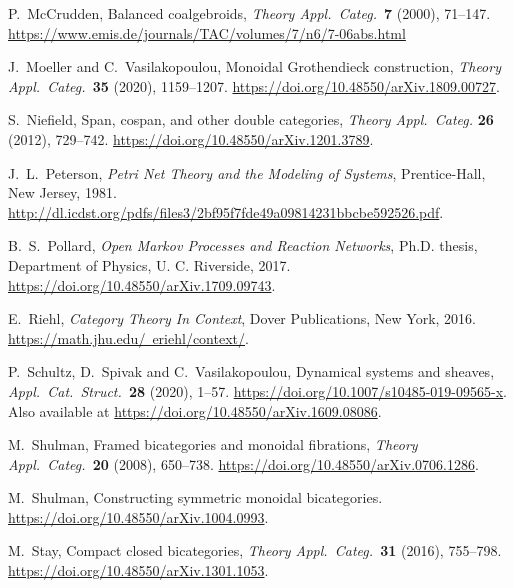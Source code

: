 \documentclass[ a4paper, onecolumn, superscriptaddress,10pt, accepted=2022-02-14, issue=3, volume=4, shorttitle=papers/compositionality-4-3 ]{compositionalityarticle}
\begin{document}
\begin{thebibliography}{100}
 P.\ McCrudden, Balanced coalgebroids, \textsl{Theory Appl.\ Categ.\ }\textbf{7} (2000), 71--147.  \hfill  \break
 \href{https://www.emis.de/journals/TAC/volumes/7/n6/7-06abs.html}{https://www.emis.de/journals/TAC/volumes/7/n6/7-06abs.html}

 J.\ Moeller and C.\ Vasilakopoulou, Monoidal Grothendieck construction, \textsl{Theory Appl.\ Categ.\ }\textbf{35} (2020), 1159--1207.  \href{https://doi.org/10.48550/arXiv.1809.00727}{https://doi.org/10.48550/arXiv.1809.00727}.

 S.~Niefield, Span, cospan, and other double categories, \textsl{Theory Appl.\ Categ.} \textbf{26} (2012), 729--742.  \href{https://doi.org/10.48550/arXiv.1201.3789}{https://doi.org/10.48550/arXiv.1201.3789}.

 J.\ L.\ Peterson, \textit{Petri Net Theory and the Modeling of Systems}, Prentice-Hall, New Jersey, 1981. \href{http://dl.icdst.org/pdfs/files3/2bf95f7fde49a09814231bbcbe592526.pdf}{http://dl.icdst.org/pdfs/files3/2bf95f7fde49a09814231bbcbe592526.pdf}.

 B.\ S.\ Pollard, \textsl{Open Markov Processes and Reaction Networks}, Ph.D. thesis, Department of Physics, U. C. Riverside, 2017. \href{https://doi.org/10.48550/arXiv.1709.09743}{https://doi.org/10.48550/arXiv.1709.09743}.

 E.\ Riehl, \textsl{Category Theory In Context}, Dover Publications, New York, 2016.  \href{https://math.jhu.edu/~eriehl/context/}{https://math.jhu.edu/~eriehl/context/}.

 P.\ Schultz, D.\ Spivak and C.\ Vasilakopoulou, Dynamical systems and sheaves, \textsl{Appl.\ Cat.\ Struct.\ }\textbf{28} (2020), 1--57.
\href{https://doi.org/10.1007/s10485-019-09565-x}{https://doi.org/10.1007/s10485-019-09565-x}.  Also available at \href{https://doi.org/10.48550/arXiv.1609.08086}{https://doi.org/10.48550/arXiv.1609.08086}.

 M.\ Shulman, Framed bicategories and monoidal fibrations, \textsl{Theory Appl.\ Categ.\ }\textbf{20} (2008), 650--738.  \href{https://doi.org/10.48550/arXiv.0706.1286}{https://doi.org/10.48550/arXiv.0706.1286}.

 M.\ Shulman, Constructing symmetric monoidal bicategories. \hfill \break
\href{https://doi.org/10.48550/arXiv.1004.0993}{https://doi.org/10.48550/arXiv.1004.0993}.

 M.\ Stay, Compact closed bicategories, \textsl{Theory Appl.\ Categ.\ }\textbf{31} (2016), 755--798.   \hfill \break \href{https://doi.org/10.48550/arXiv.1301.1053}{https://doi.org/10.48550/arXiv.1301.1053}.


\end{thebibliography}
\end{document}
